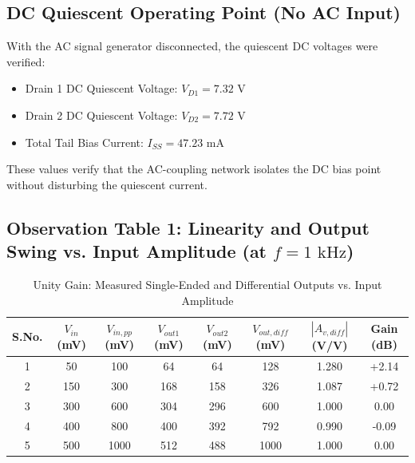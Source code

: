 \documentclass[11pt,a4paper]{article}
\begin{document}
\subsection{DC Quiescent Operating Point (No AC Input)}
With the AC signal generator disconnected, the quiescent DC voltages were verified:
\begin{itemize}
    \item Drain 1 DC Quiescent Voltage: $V_{D1} = 7.32\text{ V}$
    \item Drain 2 DC Quiescent Voltage: $V_{D2} = 7.72\text{ V}$
    \item Total Tail Bias Current: $I_{SS} = 47.23\text{ mA}$
\end{itemize}
These values verify that the AC-coupling network isolates the DC bias point without disturbing the quiescent current.

\subsection{Observation Table 1: Linearity and Output Swing vs. Input Amplitude (at $f = 1\text{ kHz}$)}
\begin{table}[H]
\centering
\caption{Unity Gain: Measured Single-Ended and Differential Outputs vs. Input Amplitude}
\label{tab:unity_vin}
\begin{tabular}{@{}cccccccc@{}}
\toprule
\textbf{S.No.} & \textbf{$V_{in}$ (mV)} & \textbf{$V_{in,pp}$ (mV)} & \textbf{$V_{out1}$ (mV)} & \textbf{$V_{out2}$ (mV)} & \textbf{$V_{out,diff}$ (mV)} & \textbf{$|A_{v,diff}|$ (V/V)} & \textbf{Gain (dB)} \\ \midrule
1 & 50  & 100  & 64  & 64  & 128  & 1.280 & +2.14 \\
2 & 150 & 300  & 168 & 158 & 326  & 1.087 & +0.72 \\
3 & 300 & 600  & 304 & 296 & 600  & 1.000 & 0.00 \\
4 & 400 & 800  & 400 & 392 & 792  & 0.990 & -0.09 \\
5 & 500 & 1000 & 512 & 488 & 1000 & 1.000 & 0.00 \\ \bottomrule
\end{tabular}
\end{table}
\end{document}
